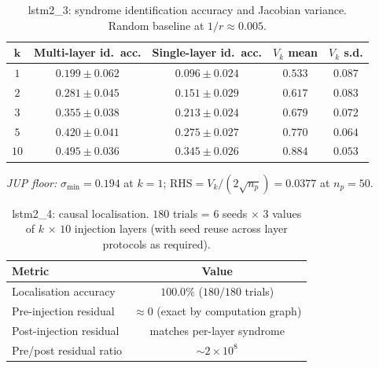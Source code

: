 \documentclass[11pt,a4paper]{article}
\begin{document}
\begin{table}[H]
\centering
\caption{lstm2\_3: syndrome identification accuracy and Jacobian variance. Random baseline at $1/r \approx 0.005$.}
\label{tab:lstm2-3}
\renewcommand{\arraystretch}{1.25}
\vspace{4pt}
\begin{tabular}{c|cccc}
\toprule
$\bm{k}$ & \textbf{Multi-layer id.\ acc.} & \textbf{Single-layer id.\ acc.}
         & \textbf{$V_k$ mean} & \textbf{$V_k$ s.d.} \\
\midrule
$1$  & $0.199 \pm 0.062$ & $0.096 \pm 0.024$ & $0.533$ & $0.087$ \\
$2$  & $0.281 \pm 0.045$ & $0.151 \pm 0.029$ & $0.617$ & $0.083$ \\
$3$  & $0.355 \pm 0.038$ & $0.213 \pm 0.024$ & $0.679$ & $0.072$ \\
$5$  & $0.420 \pm 0.041$ & $0.275 \pm 0.027$ & $0.770$ & $0.064$ \\
$10$ & $0.495 \pm 0.036$ & $0.345 \pm 0.026$ & $0.884$ & $0.053$ \\
\bottomrule
\end{tabular}

\vspace{4pt}
\noindent\footnotesize\emph{JUP floor:} $\sigma_{\min} = 0.194$ at $k = 1$;
$\mathrm{RHS} = V_k / (2\sqrt{n_p}) = 0.0377$ at $n_p = 50$.
\end{table}

\begin{table}[H]
\centering
\caption{lstm2\_4: causal localisation. $180$ trials = $6$ seeds $\times$ $3$ values of $k$ $\times$ $10$ injection layers (with seed reuse across layer protocols as required).}
\label{tab:lstm2-4}
\renewcommand{\arraystretch}{1.25}
\vspace{4pt}
\begin{tabular}{l|c}
\toprule
\textbf{Metric}                  & \textbf{Value} \\
\midrule
Localisation accuracy           & $\mathbf{100.0\%}$ ($180/180$ trials) \\
Pre-injection residual          & $\approx 0$ (exact by computation graph) \\
Post-injection residual          & matches per-layer syndrome \\
Pre/post residual ratio          & $\sim 2 \times 10^8$ \\
\bottomrule
\end{tabular}
\end{table}
\end{document}
